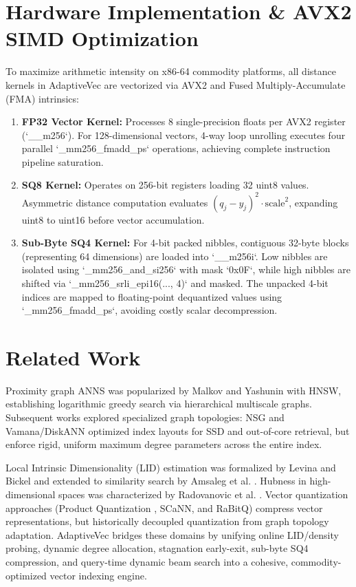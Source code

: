 \documentclass[conference,10pt]{IEEEtran}
\begin{document}
\section{Hardware Implementation \& AVX2 SIMD Optimization}
To maximize arithmetic intensity on x86-64 commodity platforms, all distance kernels in AdaptiveVec are vectorized via AVX2 and Fused Multiply-Accumulate (FMA) intrinsics:
\begin{enumerate}
    \item \textbf{FP32 Vector Kernel:} Processes 8 single-precision floats per AVX2 register (`__m256`). For 128-dimensional vectors, 4-way loop unrolling executes four parallel `_mm256_fmadd_ps` operations, achieving complete instruction pipeline saturation.
    \item \textbf{SQ8 Kernel:} Operates on 256-bit registers loading 32 uint8 values. Asymmetric distance computation evaluates $(q_j - y_j)^2 \cdot \text{scale}^2$, expanding uint8 to uint16 before vector accumulation.
    \item \textbf{Sub-Byte SQ4 Kernel:} For 4-bit packed nibbles, contiguous 32-byte blocks (representing 64 dimensions) are loaded into `__m256i`. Low nibbles are isolated using `_mm256_and_si256` with mask `0x0F`, while high nibbles are shifted via `_mm256_srli_epi16(..., 4)` and masked. The unpacked 4-bit indices are mapped to floating-point dequantized values using `_mm256_fmadd_ps`, avoiding costly scalar decompression.
\end{enumerate}

\section{Related Work}
Proximity graph ANNS was popularized by Malkov and Yashunin \cite{malkov2020hnsw} with HNSW, establishing logarithmic greedy search via hierarchical multiscale graphs. Subsequent works explored specialized graph topologies: NSG \cite{fu2019nsg} and Vamana/DiskANN \cite{subramanya2019diskann} optimized index layouts for SSD and out-of-core retrieval, but enforce rigid, uniform maximum degree parameters across the entire index. 

Local Intrinsic Dimensionality (LID) estimation was formalized by Levina and Bickel \cite{levina2005mle} and extended to similarity search by Amsaleg et al. \cite{amsaleg2015lid}. Hubness in high-dimensional spaces was characterized by Radovanovic et al. \cite{radovanovic2010hubs}. Vector quantization approaches (Product Quantization \cite{johnson2021faiss}, SCaNN, and RaBitQ) compress vector representations, but historically decoupled quantization from graph topology adaptation. AdaptiveVec bridges these domains by unifying online LID/density probing, dynamic degree allocation, stagnation early-exit, sub-byte SQ4 compression, and query-time dynamic beam search into a cohesive, commodity-optimized vector indexing engine.
\end{document}
